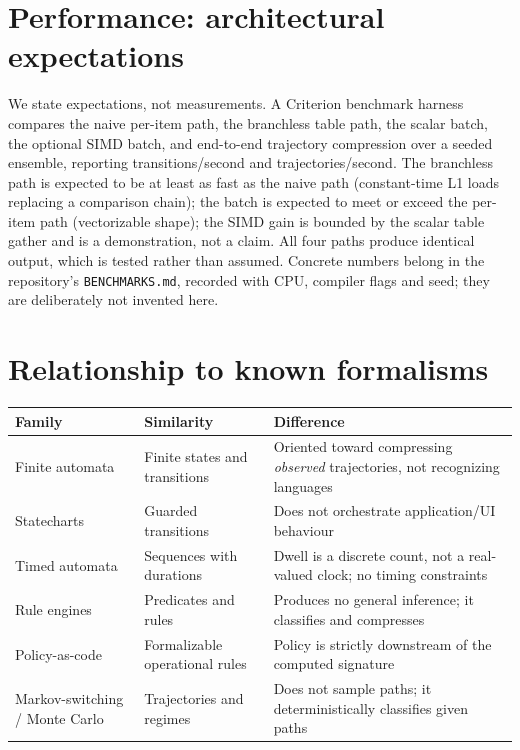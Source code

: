 \documentclass[11pt,a4paper]{article}
\begin{document}
\section{Performance: architectural expectations}
We state expectations, not measurements. A Criterion benchmark harness compares the
naive per-item path, the branchless table path, the scalar batch, the optional SIMD
batch, and end-to-end trajectory compression over a seeded ensemble, reporting
transitions/second and trajectories/second. The branchless path is expected to be
at least as fast as the naive path (constant-time L1 loads replacing a comparison
chain); the batch is expected to meet or exceed the per-item path (vectorizable
shape); the SIMD gain is bounded by the scalar table gather and is a demonstration,
not a claim. All four paths produce identical output, which is tested rather than
assumed. Concrete numbers belong in the repository's \texttt{BENCHMARKS.md},
recorded with CPU, compiler flags and seed; they are deliberately not invented
here.

\section{Relationship to known formalisms}
\begin{longtable}{p{3.4cm}p{5cm}p{5cm}}
\toprule
Family & Similarity & Difference \\
\midrule
Finite automata & Finite states and transitions & Oriented toward compressing
\emph{observed} trajectories, not recognizing languages \\
Statecharts & Guarded transitions & Does not orchestrate application/UI behaviour \\
Timed automata & Sequences with durations & Dwell is a discrete count, not a
real-valued clock; no timing constraints \\
Rule engines & Predicates and rules & Produces no general inference; it classifies
and compresses \\
Policy-as-code & Formalizable operational rules & Policy is strictly downstream of
the computed signature \\
Markov-switching / Monte Carlo & Trajectories and regimes & Does not sample paths;
it deterministically classifies given paths \\
\bottomrule
\end{longtable}
\end{document}
